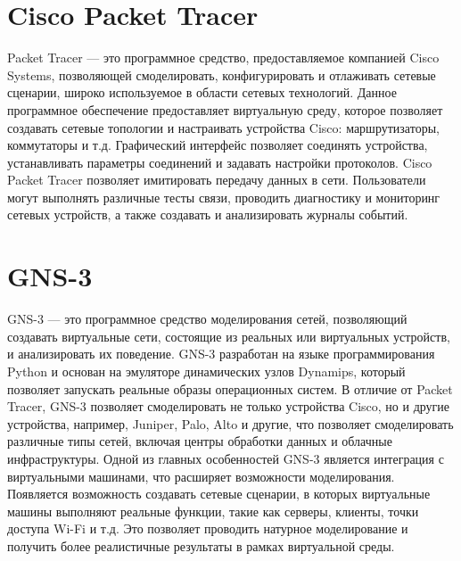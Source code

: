 \section{Cisco Packet Tracer}

Packet Tracer — это программное средство, предоставляемое компанией
Cisco Systems, позволяющей смоделировать, конфигурировать и отлаживать
сетевые сценарии, широко используемое в области сетевых
технологий. Данное программное обеспечение предоставляет виртуальную
среду, которое позволяет создавать сетевые топологии и настраивать
устройства Cisco: маршрутизаторы, коммутаторы и т.д. Графический
интерфейс позволяет соединять устройства, устанавливать параметры
соединений и задавать настройки протоколов. Cisco Packet Tracer
позволяет имитировать передачу данных в сети. Пользователи могут
выполнять различные тесты связи, проводить диагностику и мониторинг
сетевых устройств, а также создавать и анализировать журналы событий.

\section{GNS-3}

GNS-3 — это программное средство моделирования сетей, позволяющий
создавать виртуальные сети, состоящие из реальных или виртуальных
устройств, и анализировать их поведение. GNS-3 разработан на языке
программирования Python и основан на эмуляторе динамических узлов
Dynamips, который позволяет запускать реальные образы операционных
систем. В отличие от Packet Tracer, GNS-3 позволяет смоделировать не
только устройства Cisco, но и другие устройства, например, Juniper,
Palo, Alto и другие, что позволяет смоделировать различные типы сетей,
включая центры обработки данных и облачные инфраструктуры. Одной из
главных особенностей GNS-3 является интеграция с виртуальными
машинами, что расширяет возможности моделирования. Появляется
возможность создавать сетевые сценарии, в которых виртуальные машины
выполняют реальные функции, такие как серверы, клиенты, точки доступа
Wi-Fi и т.д. Это позволяет проводить натурное моделирование и
получить более реалистичные результаты в рамках виртуальной среды.





